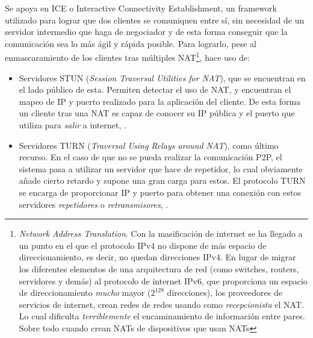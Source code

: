 Se apoya en ICE o Interactive Connectivity Establishment, \citep{wiki:ICE} un framework utilizado para lograr que dos clientes se comuniquen entre sí, sin necesidad de un servidor intermedio que haga de negociador y de esta forma conseguir que la comunicación sea lo más ágil y rápida posible. Para lograrlo, pese al enmascaramiento de los clientes tras múltiples NAT\footnote{\emph{Network Address Translation}. Con la masificación de internet se ha llegado a un punto en el que el protocolo IPv4 no dispone de más espacio de direccionamiento, es decir, no quedan direcciones IPv4. En lugar de migrar los diferentes elementos de una arquitectura de red (como switches, routers, servidores y demás) al protocolo de internet IPv6, que proporciona un espacio de direccionamiento \emph{mucho} mayor ($2^{128}$ direcciones), los proveedores de servicios de internet, crean redes de redes usando como \textit{recepcionista} el NAT. Lo cual dificulta \emph{terriblemente} el encaminamiento de información entre pares. Sobre todo cuando crean NATs de dispositivos que usan NATs}, hace uso de:
\begin{itemize}
 \item Servidores STUN (\emph{Session Traversal Utilities for NAT}), que se encuentran en el lado público de esta. Permiten detectar el uso de NAT, y encuentran el mapeo de IP y puerto realizado para la aplicación del cliente. De esta forma un cliente tras una NAT es capaz de conocer su IP pública y el puerto que utiliza para \textit{salir} a internet, \citep{wiki:STUN}.
 \item Servidores TURN (\emph{Traversal Using Relays around NAT}), como último recurso. En el caso de que no se pueda realizar la comunicación P2P, el sistema pasa a utilizar un servidor que hace de repetidor, lo cual obviamente añade cierto retardo y supone una gran carga para estos. El protocolo TURN se encarga de proporcionar IP y puerto para obtener una conexión con estos servidores \textit{repetidores} o \textit{retransmisores}, \citep{wiki:TURN}.
\end{itemize}


